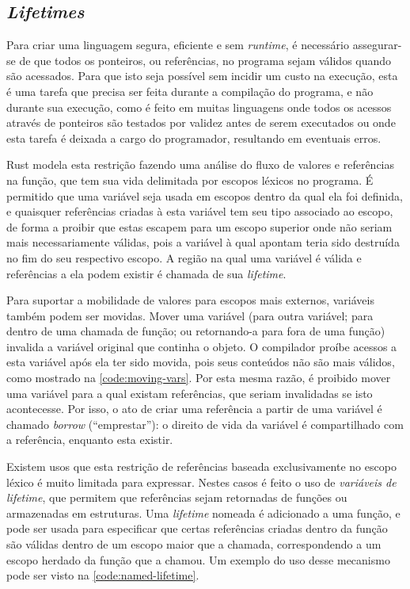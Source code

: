 \documentclass[tg]{mdtufsm}
\begin{document}
\subsection{\emph{Lifetimes}}

Para criar uma linguagem segura, eficiente e sem \emph{runtime}, é necessário assegurar-se de que todos os ponteiros, ou referências, no programa sejam válidos quando são acessados. Para que isto seja possível sem incidir um custo na execução, esta é uma tarefa que precisa ser feita durante a compilação do programa, e não durante sua execução, como é feito em muitas linguagens onde todos os acessos através de ponteiros são testados por validez antes de serem executados ou onde esta tarefa é deixada a cargo do programador, resultando em eventuais erros.

Rust modela esta restrição fazendo uma análise do fluxo de valores e referências na função, que tem sua vida delimitada por escopos léxicos no programa. É permitido que uma variável seja usada em escopos dentro da qual ela foi definida, e quaisquer referências criadas à esta variável tem seu tipo associado ao escopo, de forma a proibir que estas escapem para um escopo superior onde não seriam mais necessariamente válidas, pois a variável à qual apontam teria sido destruída no fim do seu respectivo escopo. A região na qual uma variável é válida e referências a ela podem existir é chamada de sua \emph{lifetime}.

Para suportar a mobilidade de valores para escopos mais externos, variáveis também podem ser movidas. Mover uma variável (para outra variável; para dentro de uma chamada de função; ou retornando-a para fora de uma função) invalida a variável original que continha o objeto. O compilador proíbe acessos a esta variável após ela ter sido movida, pois seus conteúdos não são mais válidos, como mostrado na \autoref{code:moving-vars}. Por esta mesma razão, é proibido mover uma variável para a qual existam referências, que seriam invalidadas se isto acontecesse. Por isso, o ato de criar uma referência a partir de uma variável é chamado \emph{borrow} (``emprestar''): o direito de vida da variável é compartilhado com a referência, enquanto esta existir.

Existem usos que esta restrição de referências baseada exclusivamente no escopo léxico é muito limitada para expressar. Nestes casos é feito o uso de \emph{variáveis de lifetime}, que permitem que referências sejam retornadas de funções ou armazenadas em estruturas. Uma \emph{lifetime} nomeada é adicionado a uma função, e pode ser usada para especificar que certas referências criadas dentro da função são válidas dentro de um escopo maior que a chamada, correspondendo a um escopo herdado da função que a chamou. Um exemplo do uso desse mecanismo pode ser visto na \autoref{code:named-lifetime}. \citep{rust-lifetimes}
\end{document}
